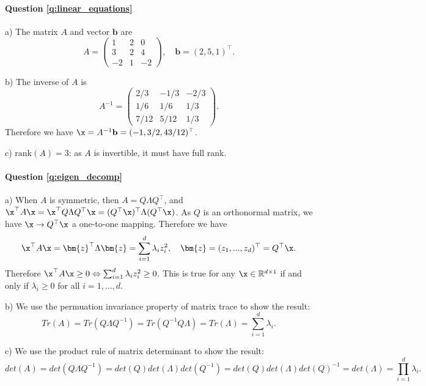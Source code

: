 \paragraph{Question \ref{q:linear_equations}}

a) The matrix $A$ and vector $\mathbf{b}$ are
\begin{equation*}
A = \begin{pmatrix}
1 & 2 & 0 \\
3 & 2 & 4 \\
-2 & 1 & -2
\end{pmatrix}, \quad \mathbf{b} = (2, 5, 1)^\top.
\end{equation*}

b) The inverse of $A$ is 
\begin{equation*}
A^{-1} = \begin{pmatrix}
2/3 & -1/3 & -2/3 \\
1/6 & 1/6 & 1/3 \\
7/12 & 5/12 & 1/3
\end{pmatrix}.
\end{equation*}
Therefore we have $\x = A^{-1} \mathbf{b} = (-1, 3/2, 43/12)^\top$.

c) $\text{rank}(A) = 3$: as $A$ is invertible, it must have full rank.

\paragraph{Question \ref{q:eigen_decomp}}

a) When $A$ is symmetric, then $A = Q \Lambda Q^\top$, and $\x^\top A \x = \x^\top Q \Lambda Q^\top \x = (Q^\top \x)^\top \Lambda (Q^\top \x)$. As $Q$ is an orthonormal matrix, we have $\x \rightarrow Q^\top \x$ a one-to-one mapping. Therefore we have
$$\x^\top A \x = \bm{z}^\top \Lambda \bm{z} = \sum_{i=1}^d \lambda_i z_i^2, \quad \bm{z} = (z_1, ..., z_d)^\top = Q^\top \x.$$
Therefore $\x^\top A \x \geq 0 \Leftrightarrow \sum_{i=1}^d \lambda_i z_i^2 \geq 0$. This is true for any $\x \in \mathbb{R}^{d \times 1}$ if and only if $\lambda_i \geq 0$ for all $i = 1,..., d$.

b) We use the permuation invariance property of matrix trace to show the result:
$$Tr(A) = Tr(Q \Lambda Q^{-1}) = Tr(Q^{-1} Q \Lambda) = Tr(\Lambda) = \sum_{i=1}^d \lambda_i.$$

c) We use the product rule of matrix determinant to show the result:
$$det(A) = det(Q \Lambda Q^{-1}) = det(Q) det(\Lambda) det(Q^{-1}) = det(Q) det(\Lambda) det(Q)^{-1} = det(\Lambda) = \prod_{i=1}^d \lambda_i.$$

